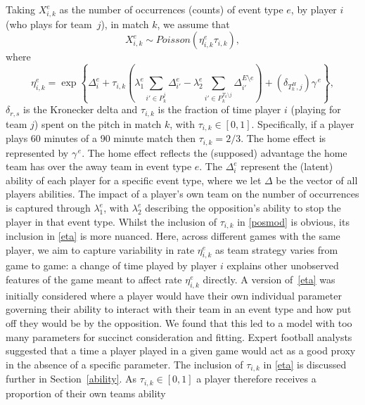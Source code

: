 \documentclass[11pt,a4paper]{article}
\begin{document}
Taking $X_{i,k}^{e}$ as the number of occurrences (counts) of event 
type $e$, by player $i$ (who plays for team~$j$), in match $k$, we assume that 
\begin{equation} \label{posmod}
X_{i,k}^{e}\sim Poisson\left(\eta_{i,k}^{e}\tau_{i,k} \right), 
\end{equation}
where
\begin{equation} \label{eta}
\eta_{i,k}^{e} = \exp\left\{\Delta_i^{e} 
                          + \tau_{i,k}\left(\lambda_1^e\sum_{i'\in P_k^j}\Delta_{i'}^{e}  
                          - \lambda_2^e\sum_{i'\in P_k^{T_k\setminus j}}\Delta_{i'}^{E\setminus e}\right)  
                          + \left(\delta_{T_k^H,j}\right)\gamma^{\,e} \right\},
\end{equation}
$\delta_{r,s}$ is the Kronecker delta and $\tau_{i,k}$ is the 
fraction of time player $i$ (playing for team $j$) spent on the pitch 
in match $k$, with $\tau_{i,k}\in[0, 1]$. Specifically, if a player plays 
60 minutes of a 90 minute match then $\tau_{i,k}=2/3$. The home effect 
is represented by $\gamma^{\,e}$. The home effect reflects the (supposed) 
advantage the home team has over the away team in event type $e$. The 
$\Delta_i^{e}$ represent the (latent) ability of each player for a 
specific event type, where we let $\Delta$ be the vector of all 
players abilities. The impact of a player's own team on the number of 
occurrences is captured through $\lambda_1^e$, with $\lambda_2^e$ 
describing the opposition's ability to stop the player in that event 
type. Whilst the inclusion 
of $\tau_{i,k}$ in \eqref{posmod} is obvious, its inclusion in \eqref{eta} 
is more nuanced. Here, across different games with the same player, we aim 
to capture variability in rate $\eta_{i,k}^{e}$ as team strategy varies 
from game to game: a change of time played by player $i$ explains other 
unobserved features of the game meant to affect rate $\eta_{i,k}^e$ 
directly. A version of~\eqref{eta} was initially considered where a 
player would have their own individual parameter governing their ability to 
interact with their team in an event type and how put off they would 
be by the opposition. We found that this led to a model with too many 
parameters for succinct consideration and fitting. Expert football 
analysts suggested that a time a player played in a given game would act as a good 
proxy in the absence of a specific parameter. The inclusion of $\tau_{i,k}$ in 
\eqref{eta} is discussed further in Section~\ref{ability}. As $\tau_{i,k}\in[0, 1]$ %
a player therefore receives a proportion of their own teams ability 
\end{document}
